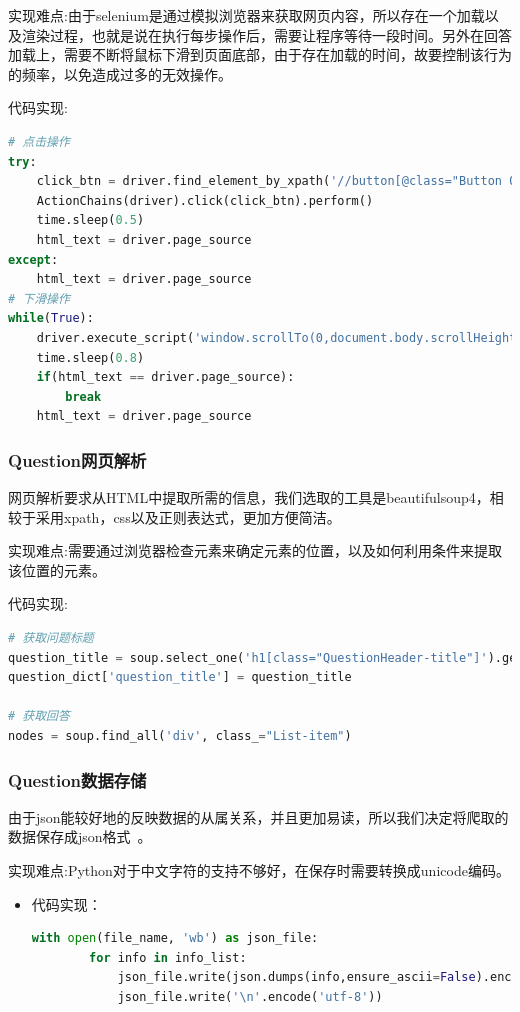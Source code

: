 \documentclass[UTF-8,a4paper, 12pt]{article}
\numberwithin{equation}{section}
\begin{document}
实现难点:由于selenium是通过模拟浏览器来获取网页内容，所以存在一个加载以及渲染过程，也就是说在执行每步操作后，需要让程序等待一段时间。另外在回答加载上，需要不断将鼠标下滑到页面底部，由于存在加载的时间，故要控制该行为的频率，以免造成过多的无效操作。

代码实现:

\begin{lstlisting}[language=python]
# 点击操作
try:
    click_btn = driver.find_element_by_xpath('//button[@class="Button QuestionRichText-more Button--plain"]')
    ActionChains(driver).click(click_btn).perform()
    time.sleep(0.5)
    html_text = driver.page_source
except:
    html_text = driver.page_source
# 下滑操作
while(True):
    driver.execute_script('window.scrollTo(0,document.body.scrollHeight)')
    time.sleep(0.8)
    if(html_text == driver.page_source):
        break
    html_text = driver.page_source

\end{lstlisting}

\subsubsection{Question网页解析}
网页解析要求从HTML中提取所需的信息，我们选取的工具是beautifulsoup4，相较于采用xpath，css以及正则表达式，更加方便简洁。

实现难点:需要通过浏览器检查元素来确定元素的位置，以及如何利用条件来提取该位置的元素。

代码实现:
\begin{lstlisting}[language=python]
# 获取问题标题
question_title = soup.select_one('h1[class="QuestionHeader-title"]').get_text()
question_dict['question_title'] = question_title

# 获取回答
nodes = soup.find_all('div', class_="List-item")
\end{lstlisting}

\subsubsection{Question数据存储}
由于json能较好地的反映数据的从属关系，并且更加易读，所以我们决定将爬取的数据保存成json格式~\cite{bibtex3}。

实现难点:Python对于中文字符的支持不够好，在保存时需要转换成unicode编码。

\begin{itemize}
  \item 代码实现：
  \begin{lstlisting}[language=python]
    with open(file_name, 'wb') as json_file:
        for info in info_list:
            json_file.write(json.dumps(info,ensure_ascii=False).encode('utf-8'))
            json_file.write('\n'.encode('utf-8'))
  \end{lstlisting}
\end{itemize}
\end{document}
